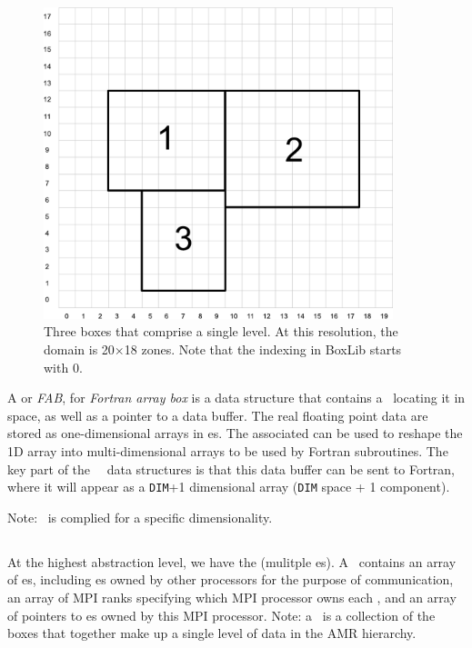 \begin{figure}[t]
\centering
\includegraphics[width=4.0in]{index_grid2}
\caption[Single-level grid structure]
{\label{fig:soft:indexspace} Three boxes that comprise a single level.  At this
  resolution, the domain is 20$\times$18 zones.  Note that the
  indexing in BoxLib starts with $0$.}
\end{figure}


A \code{\farraybox} or {\em FAB}, for {\em Fortran array box} is a data
structure that contains a \bbox\ locating it in space, as well as a
pointer to a data buffer.  The real floating point data are stored as
one-dimensional arrays in \farraybox es.  The associated \bbox can be
used to reshape the 1D array into multi-dimensional arrays to be used
by Fortran subroutines.  The key part of the \cpp\ \boxlib\ data
structures is that this data buffer can be sent to Fortran, where it
will appear as a {\tt DIM}+1 dimensional array ({\tt DIM} space + 1
component).

Note: \castro\ is complied for a specific dimensionality.


\subsection{\multifab}

At the highest abstraction level, we have the \code{\multifab} (mulitple
\farraybox es).  A \multifab\ contains an array of \bbox es, including
\bbox es owned by other processors for the purpose of communication,
an array of MPI ranks specifying which MPI processor owns each \bbox,
and an array of pointers to \farraybox es owned by this MPI
processor.   Note: a
\multifab\ is a collection of the boxes that together make up a single
level of data in the AMR hierarchy.

